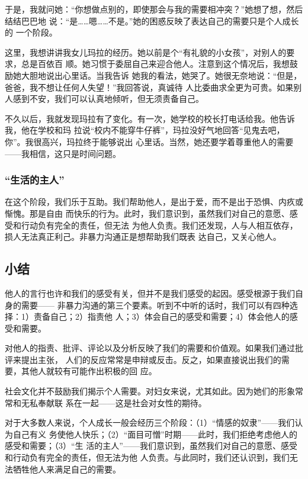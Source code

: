 \documentclass{ctexart}
\begin{document}
于是，我就问她：``你想做点别的，即使那会与我的需要相冲突？''她想了想，然后结结巴巴地
说：``是\ldots\ldots 嗯\ldots\ldots 不是。''她的困惑反映了表达自己的需要只是个人成长的
一个阶段。

这里，我想讲讲我女儿玛拉的经历。她以前是个``有礼貌的小女孩''，对别人的要求，总是百依百
顺。她习惯于委屈自己来迎合他人。注意到这个情况后，我想鼓励她大胆地说出心里话。当我告诉
她我的看法，她哭了。她很无奈地说：``但是，爸爸，我不想让任何人失望！''我回答说，真诚待
人比委曲求全更为可贵。如果别人感到不安，我们可以认真地倾听，但无须责备自己。

不久以后，我就发现玛拉有了变化。有一次，她学校的校长打电话给我。他告诉我，他在学校和玛
拉说``校内不能穿牛仔裤''，玛拉没好气地回答``见鬼去吧，你''。我很高兴，玛拉终于能够说出
心里话。当然，她还要学着尊重他人的需要------我相信，这只是时间问题。

\subsubsection{``生活的主人''}

在这个阶段，我们乐于互助。我们帮助他人，是出于爱，而不是出于恐惧、内疚或惭愧。那是自由
而快乐的行为。此时，我们意识到，虽然我们对自己的意愿、感受和行动负有完全的责任，但无法
为他人负责。我们还发现，人与人相互依存，损人无法真正利己。非暴力沟通正是想帮助我们既表
达自己，又关心他人。

\endgroup

\subsection{小结}

他人的言行也许和我们的感受有关，但并不是我们感受的起因。感受根源于我们自身的需要------
非暴力沟通的第三个要素。听到不中听的话时，我们可以有四种选择：1）责备自己；2）指责他
人；3）体会自己的感受和需要；4）体会他人的感受和需要。

对他人的指责、批评、评论以及分析反映了我们的需要和价值观。如果我们通过批评来提出主张，
人们的反应常常是申辩或反击。反之，如果直接说出我们的需要，其他人就较有可能作出积极的回
应。

社会文化并不鼓励我们揭示个人需要。对妇女来说，尤其如此。因为她们的形象常常和无私奉献联
系在一起------这是社会对女性的期待。

对于大多数人来说，个人成长一般会经历三个阶段：（1）``情感的奴隶''------我们认为自己有义
务使他人快乐；（2）``面目可憎''时期------此时，我们拒绝考虑他人的感受和需要；（3）``生
活的主人''------我们意识到，虽然我们对自己的意愿、感受和行动负有完全的责任，但无法为他
人负责。与此同时，我们还认识到，我们无法牺牲他人来满足自己的需要。
\end{document}
